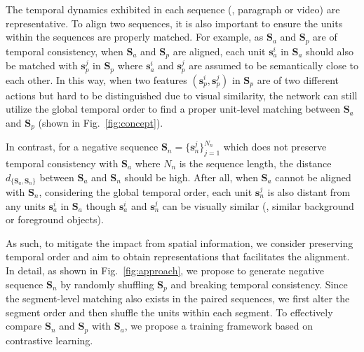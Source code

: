 
The temporal dynamics exhibited in each sequence (\ie, paragraph or video) are representative. To align two sequences, it is also important to ensure the units within the sequences are properly matched. 
For example, as $\mathbf{S}_a$ and $\mathbf{S}_p$ are of temporal consistency, when $\mathbf{S}_a$ and $\mathbf{S}_p$ are aligned, each unit $\mathbf{s}_a^i$ in $\mathbf{S}_a$ should also be matched with $\mathbf{s}_p^j$ in $\mathbf{S}_p$ where $\mathbf{s}_a^i$ and $\mathbf{s}_p^j$ are assumed to be semantically close to each other.
In this way, when two features $(\mathbf{s}_p^i,\mathbf{s}_p^j)$ in $\mathbf{S}_p$ are of two different actions but hard to be distinguished due to visual similarity, the network can still utilize the global temporal order to find a proper unit-level matching between $\mathbf{S}_a$ and $\mathbf{S}_p$ (shown in Fig.~\ref{fig:concept}).

 In contrast, for a negative sequence $\mathbf{S}_n = \{\mathbf{s}_n^j\}_{j=1}^{N_n}$ which does not preserve temporal consistency with $\mathbf{S}_a$ where $N_n$ is the sequence length, the distance $d_{\{\mathbf{S}_a,\mathbf{S}_n\}}$ between $\mathbf{S}_a$ and $\mathbf{S}_n$ should be high. After all, when $\mathbf{S}_a$ cannot be aligned with $\mathbf{S}_n$, considering the global temporal order, each unit $\mathbf{s}_n^j$ is also distant from any units $\mathbf{s}_a^i$ in $\mathbf{S}_a$ though $\mathbf{s}_a^i$ and $\mathbf{s}_n^j$ can be visually similar (\eg, similar background or foreground objects). 

As such, to mitigate the impact from spatial information, we consider preserving temporal order and aim to obtain representations that facilitates the alignment.
In detail, as shown in Fig.~\ref{fig:approach}, we propose to generate negative sequence $\mathbf{S}_n$ by randomly shuffling $\mathbf{S}_p$ and breaking temporal consistency.
Since the segment-level matching also exists in the paired sequences, we first alter the segment order and then shuffle the units within each segment.
To effectively compare $\mathbf{S}_n$ and $\mathbf{S}_p$ with $\mathbf{S}_a$, we propose a training framework \approach{} based on contrastive learning.

